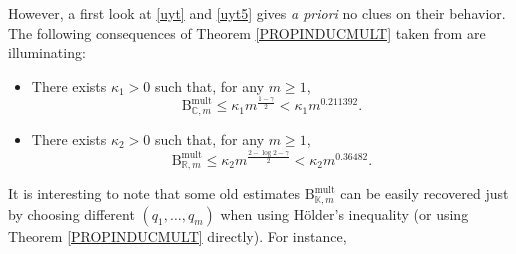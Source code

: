 \documentclass[10pt]{amsart}
\numberwithin{equation}{section}
\begin{document}
However, a first look at \eqref{uyt} and \eqref{uyt5} gives \textit{a priori
}no clues on their behavior. The following consequences of Theorem \ref{PROPINDUCMULT} taken from \cite{bps} are illuminating:

\begin{itemize}
\item There exists $\kappa _{1}>0$ such that, for any $m\geq 1$,
\begin{equation*}
\mathrm{B}_{\mathbb{C},m}^{\mathrm{mult}}\leq \kappa _{1}m^{\frac{1-\gamma }{2}}<\kappa _{1}m^{0.211392}.
\end{equation*}

\item There exists $\kappa _{2}>0$ such that, for any $m\geq 1$,
\begin{equation*}
\mathrm{B}_{\mathbb{R},m}^{\mathrm{mult}}\leq \kappa _{2}m^{\frac{2-\log
2-\gamma }{2}}<\kappa _{2}m^{0.36482}.
\end{equation*}
\end{itemize}

It is interesting to note that some old estimates $\mathrm{B}_{\mathbb{K},m}^{\mathrm{mult}}$ can be easily recovered just by choosing different $\left( q_{1},\ldots ,q_{m}\right) $ when using H\"{o}lder's inequality (or
using Theorem \ref{PROPINDUCMULT} directly). For instance,
\end{document}
